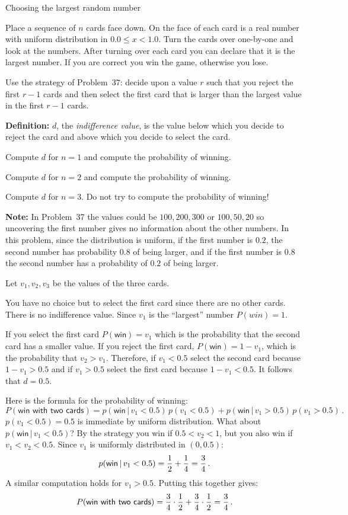\begin{prob}{Choosing the largest random number}

Place a sequence of $n$ cards face down. On the face of each card is a real number with uniform distribution in $0.0\leq x<1.0$. Turn the cards over one-by-one and look at the numbers. After turning over each card you can declare that it is the largest number. If you are correct you win the game, otherwise you lose.

Use the strategy of Problem~37: decide upon a value $r$ such that you reject the first $r-1$ cards and then select the first card that is larger than the largest value in the first $r-1$ cards.

\textbf{Definition:} $d$, the \emph{indifference value}, is the value below which you decide to reject the card and above which you decide to select the card.

 Compute $d$ for $n=1$ and compute the probability of winning.

 Compute $d$ for $n=2$ and compute the probability of winning.

 Compute $d$ for $n=3$. Do not try to compute the probability of winning!

\textbf{Note:} In Problem~37 the values could be $100, 200, 300$ or $100, 50, 20$ so uncovering the first number gives no information about the other numbers. In this problem, since the distribution is uniform, if the first number is $0.2$, the second number has probability $0.8$ of being larger, and if the first number is $0.8$ the second number has a probability of $0.2$ of being larger.

\end{prob}

\solution{}

Let $v_1,v_2,v_3$ be the values of the three cards.

 You have no choice but to select the first card since there are no other cards. There is no indifference value. Since $v_1$ is the ``largest'' number $P({win})=1$.

 If you select the first card $P(\textsf{win})=v_1$ which is the probability that the second card has a smaller value. If you reject the first card, $P(\textsf{win})=1-v_1$, which is the probability that $v_2>v_1$. Therefore, if $v_1<0.5$ select the second card because $1-v_1>0.5$ and if $v_1>0.5$ select the first card because $1-v_1<0.5$. It follows that $d=0.5$.

Here is the formula for the probability of winning:
\[
P(\textsf{win with two cards}) = p(\textsf{win} \,|\,v_1<0.5)\,p(v_1<0.5)+ p(\textsf{win}\,|\,v_1>0.5)\,p(v_1>0.5)\,.
\]
$p(v_1<0.5)=0.5$ is immediate by uniform distribution. What about $p(\textsf{win} \,|\,v_1<0.5)$? By the strategy you win if $0.5<v_2<1$, but you also win if $v_1<v_2<0.5$. Since $v_1$ is uniformly distributed in $(0,0.5)$:
\[
p(\textsf{win} \,|\,v_1<0.5)=\displaystyle\frac{1}{2} + \displaystyle\frac{1}{4}=\displaystyle\frac{3}{4}\,.
\]
A similar computation holds for $v_1>0.5$. Putting this together gives:
\[
P(\textsf{win with two cards})=\displaystyle\frac{3}{4}\cdot\displaystyle\frac{1}{2}+\displaystyle\frac{3}{4}\cdot\displaystyle\frac{1}{2}=\displaystyle\frac{3}{4}\,.
\]

